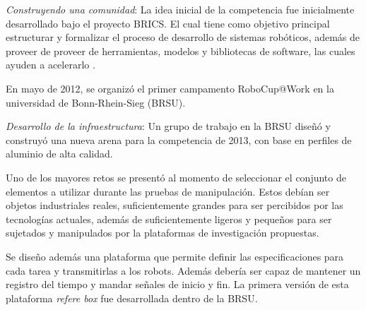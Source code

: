 \documentclass[12pt]{article}
\begin{document}
\emph{Construyendo una comunidad}: La idea inicial de la competencia fue inicialmente desarrollado bajo el proyecto BRICS. El cual tiene como objetivo principal estructurar y formalizar el proceso de desarrollo de sistemas robóticos, además de proveer de proveer de herramientas, modelos y bibliotecas de software, las cuales ayuden a acelerarlo \cite{brics2015}.

En mayo de 2012, se organizó el primer campamento RoboCup@Work en la universidad de Bonn-Rhein-Sieg (BRSU).

\emph{Desarrollo de la infraestructura}: Un grupo de trabajo en la BRSU diseñó y construyó una nueva arena para la competencia de 2013, con base en perfiles de aluminio de alta calidad.

Uno de los mayores retos se presentó al momento de seleccionar el conjunto de elementos a utilizar durante las pruebas de manipulación. Estos debían ser objetos industriales reales, suficientemente grandes para ser percibidos por las tecnologías actuales, además de suficientemente ligeros y pequeños para ser sujetados y manipulados por la plataformas de investigación propuestas.

Se diseño además una plataforma que permite definir las especificaciones para cada tarea y transmitirlas a los robots. Además debería ser capaz de mantener un registro del tiempo y mandar señales de inicio y fin. La primera versión de esta plataforma \emph{refere box} fue desarrollada dentro de la BRSU.



\end{document}
